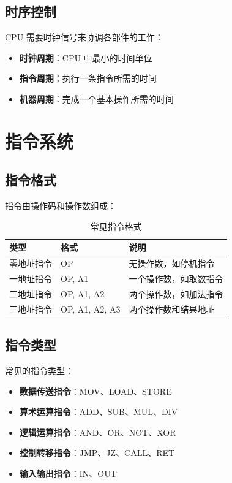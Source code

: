 \documentclass[12pt,UTF8]{ctexbook}
\begin{document}
\section{时序控制}

CPU 需要时钟信号来协调各部件的工作：

\begin{itemize}[leftmargin=2cm]
    \item \textbf{时钟周期}：CPU 中最小的时间单位
    \item \textbf{指令周期}：执行一条指令所需的时间
    \item \textbf{机器周期}：完成一个基本操作所需的时间
\end{itemize}

\chapter{指令系统}
\label{chap:instructions}

\section{指令格式}

指令由操作码和操作数组成：

\begin{table}[htbp]
    \centering
    \caption{常见指令格式}
    \begin{tabular}{|p{3cm}|p{3cm}|p{4cm}|}
        \hline
        \textbf{类型} & \textbf{格式} & \textbf{说明} \\
        \hline
        零地址指令 & OP & 无操作数，如停机指令 \\
        \hline
        一地址指令 & OP, A1 & 一个操作数，如取数指令 \\
        \hline
        二地址指令 & OP, A1, A2 & 两个操作数，如加法指令 \\
        \hline
        三地址指令 & OP, A1, A2, A3 & 两个操作数和结果地址 \\
        \hline
    \end{tabular}
\end{table}

\section{指令类型}

常见的指令类型：

\begin{itemize}[leftmargin=2cm]
    \item \textbf{数据传送指令}：MOV、LOAD、STORE
    \item \textbf{算术运算指令}：ADD、SUB、MUL、DIV
    \item \textbf{逻辑运算指令}：AND、OR、NOT、XOR
    \item \textbf{控制转移指令}：JMP、JZ、CALL、RET
    \item \textbf{输入输出指令}：IN、OUT
\end{itemize}
\end{document}
